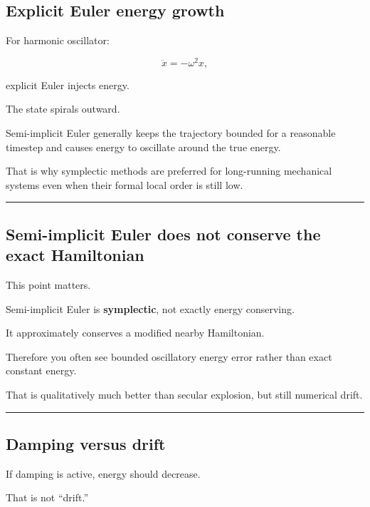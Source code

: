 \subsection{Explicit Euler energy growth}\label{06-engine-ii-ch039-explicit-euler-energy-growth}

For harmonic oscillator:

\[
\ddot x=-\omega^2x,
\]

explicit Euler injects energy.

The state spirals outward.

Semi-implicit Euler generally keeps the trajectory bounded for a reasonable timestep and causes energy to oscillate around the true energy.

That is why symplectic methods are preferred for long-running mechanical systems even when their formal local order is still low.

\begin{center}\rule{0.5\linewidth}{0.5pt}\end{center}

\subsection{Semi-implicit Euler does not conserve the exact Hamiltonian}\label{06-engine-ii-ch039-semi-implicit-euler-does-not-conserve-the-exact-hamiltonian}

This point matters.

Semi-implicit Euler is \textbf{symplectic}, not exactly energy conserving.

It approximately conserves a modified nearby Hamiltonian.

Therefore you often see bounded oscillatory energy error rather than exact constant energy.

That is qualitatively much better than secular explosion, but still numerical drift.

\begin{center}\rule{0.5\linewidth}{0.5pt}\end{center}

\subsection{Damping versus drift}\label{06-engine-ii-ch039-damping-versus-drift}

If damping is active, energy should decrease.

That is not ``drift.''

